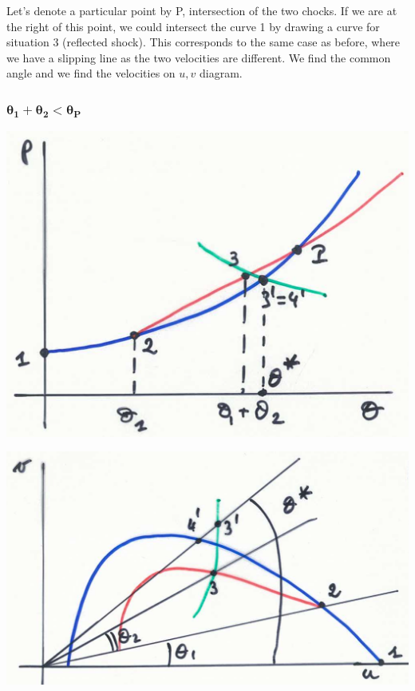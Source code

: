Let's denote a particular point by P, intersection of the two chocks. If we are at the right of this point, we could intersect the curve 1 by drawing a curve for situation 3 (reflected shock). This corresponds to the same case as before, where we have a slipping line as the two velocities are different. We find the common angle and we find the velocities on $u,v$ diagram. 

\subsubsection{$\bm{\theta _1 + \theta _2 < \theta _P}$}
\begin{center}
\begin{minipage}{0.33\textwidth}
\includegraphics[scale=0.2]{ch9/20}
\end{minipage}
\begin{minipage}{0.4\textwidth}
\includegraphics[scale=0.2]{ch9/21}
\end{minipage}
\end{center}

